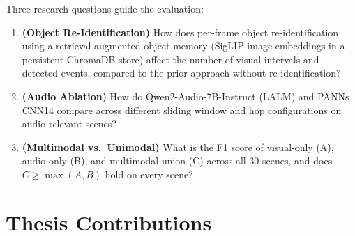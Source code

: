 Three research questions guide the evaluation:

\begin{enumerate}
  \item \textbf{(Object Re-Identification)} How does per-frame object re-identification using a retrieval-augmented object memory (SigLIP image embeddings in a persistent ChromaDB store) affect the number of visual intervals and detected events, compared to the prior approach without re-identification?
  \item \textbf{(Audio Ablation)} How do Qwen2-Audio-7B-Instruct (LALM) and PANNs CNN14 compare across different sliding window and hop configurations on audio-relevant scenes?
  \item \textbf{(Multimodal vs.\ Unimodal)} What is the F1 score of visual-only (A), audio-only (B), and multimodal union (C) across all 30 scenes, and does $C \ge \max(A,B)$ hold on every scene?
\end{enumerate}

\section{Thesis Contributions}


